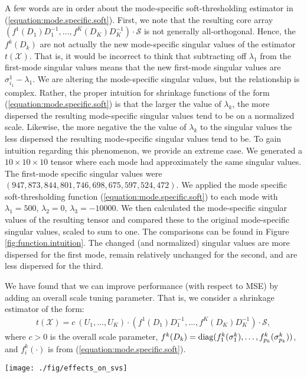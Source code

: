 A few words are in order about the mode-specific soft-thresholding estimator in (\ref{equation:mode.specific.soft}). First, we note that the resulting core array $(f^1(D_1)D_1^{-1},\ldots,f^K(D_K)D_K^{-1}) \cdot \mathcal{S}$ is not generally all-orthogonal. Hence, the $f^k(D_k)$ are not actually the new mode-specific singular values of the estimator $t(\mathcal{X})$. That is, it would be incorrect to think that subtracting off $\lambda_1$ from the first-mode singular values means that the new first-mode singular values are $\sigma_{i_1}^1 - \lambda_1$. We are altering the mode-specific singular values, but the relationship is complex. Rather, the proper intuition for shrinkage functions of the form (\ref{equation:mode.specific.soft}) is that the larger the value of $\lambda_k$, the more dispersed the resulting mode-specific singular values tend to be on a normalized scale. Likewise, the more negative the the value of $\lambda_k$ to the singular values the less dispersed the resulting mode-specific singular values tend to be. To gain intuition regarding this phenomenon, we provide an extreme case. We generated a $10 \times 10 \times 10$ tensor where each mode had approximately the same singular values. The first-mode specific singular values were $(947, 873, 844, 801, 746, 698, 675, 597, 524, 472)$. We applied the mode specific soft-thresholding function (\ref{equation:mode.specific.soft}) to each mode with $\lambda_1 = 500$, $\lambda_2 = 0$, $\lambda_3 = -10000$. We then calculated the mode-specific singular values of the resulting tensor and compared these to the original mode-specific singular values, scaled to sum to one. The comparisons can be found in Figure \ref{fig:function.intuition}. The changed (and normalized) singular values are more dispersed for the first mode, remain relatively unchanged for the second, and are less dispersed for the third.



We have found that we can improve performance (with respect to MSE) by adding an overall scale tuning parameter. That is, we consider a shrinkage estimator of the form:
\begin{align}
  \label{equation:msst.est}
  t(\mathcal{X}) = c\ (U_1,\ldots,U_K)\cdot(f^1(D_1)D_1^{-1},\ldots,f^K(D_K)D_K^{-1})\cdot\mathcal{S},
\end{align}
where $c > 0$ is the overall scale parameter, $f^k(D_k) = \operatorname*{diag}(f_1^k(\sigma_1^k),\ldots,f_{p_k}^k(\sigma_{p_k}^k))$, and $f_i^k(\cdot)$ is from (\ref{equation:mode.specific.soft}).

\begin{figure*}
\begin{center}
\texttt{[image: ./fig/effects\_on\_svs]}
\caption{Singular values for the three modes, before and after shrinkage, normalized to sum to one.}
\label{fig:function.intuition}
\end{center}
\end{figure*}
